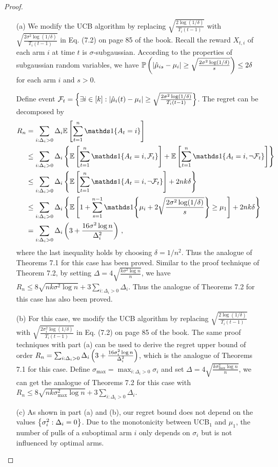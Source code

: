 \begin{proof}
\begin{enumerate}
    \item[(a)] We modify the UCB algorithm by replacing $\sqrt{\frac{2\log (1/\delta)}{T_i(t-1)}}$ with $\sqrt{\frac{2\sigma^2 \log (1/\delta)}{T_i(t-1)}}$ in Eq. (7.2) on page 85 of the book. 
    Recall the reward $X_{t,i}$ of each arm $i$ at time $t$ is $\sigma$-subgaussian. According to the properties of subgaussian random variables, we have $\mathbb{P} \left(\left| \hat{\mu}_{is} - \mu_i  \right|\ge \sqrt{\frac{2\sigma^2 \log (1/\delta)}{s}} \right) \le 2\delta$ for each arm $i$ and $s>0$. 

    Define event $\mathcal{F}_t = \left\{ \exists i \in [k]: \left| \hat{\mu}_{i}(t) - \mu_i  \right|\ge \sqrt{\frac{2\sigma^2 \log (1/\delta)}{T_i(t-1)}} \right\}$. 
    The regret can be decomposed by
    \begin{align*}
        R_n &= \sum_{i:\Delta_i>0}\Delta_i \EE{ \sum_{t=1}^n \bOne{A_t = i} } \\
        &\le \sum_{i:\Delta_i>0}\Delta_i \set{ \EE{ \sum_{t=1}^n \bOne{A_t = i, \cF_t} } +  \EE{ \sum_{t=1}^n \bOne{A_t = i, \neg \cF_t} } } \\
        &\le \sum_{i:\Delta_i>0}\Delta_i \set{ \EE{ \sum_{t=1}^n \bOne{A_t = i, \neg \cF_t} } +  2nk\delta }\\
        &\le \sum_{i:\Delta_i>0}\Delta_i \set{ \EE{ 1+ \sum_{s=1}^{n-1} \bOne{ \mu_i + 2\sqrt{\frac{2\sigma^2 \log (1/\delta)}{s}} } \ge \mu_1 }  +  2nk\delta } \\
        &= \sum_{i:\Delta_i>0}\Delta_i \bracket{ 3 + \frac{16\sigma^2 \log n}{\Delta_i^2}} \,,
    \end{align*}
    where the last inequality holds by choosing $\delta=1/n^2$.  Thus the analogue of Theorems 7.1 for this case has been proved. Similar to the proof technique of Theorem 7.2, by setting $\Delta = 4\sqrt{\frac{k\sigma^2 \log n}{n}}$, we have $R_n \le 8\sqrt{nk\sigma^2 \log n} + 3\sum_{i:\Delta_i >0} \Delta_i$. Thus the analogue of Theorems 7.2 for this case has also been proved. 

    \item[(b)] For this case, we modify the UCB algorithm by replacing $\sqrt{\frac{2\log (1/\delta)}{T_i(t-1)}}$ with $\sqrt{\frac{2\sigma_i^2 \log (1/\delta)}{T_i(t-1)}}$ in Eq. (7.2) on page 85 of the book. The same proof techniques with part (a) can be used to derive the regret upper bound of order $R_n = \sum_{i:\Delta_i>0}\Delta_i \left( 3 + \frac{16\sigma_i^2 \log n}{\Delta_i^2}\right)$, which is the analogue of Theorems 7.1 for this case. Define $\sigma_{\max} = \max_{i:\Delta_i>0}\sigma_i$ and set $\Delta = 4\sqrt{\frac{k\sigma_{\max}^2 \log n}{n}}$, we can get the analogue of Theorems 7.2 for this case with $R_n \le 8\sqrt{nk\sigma_{\max}^2 \log n} + 3\sum_{i:\Delta_i >0} \Delta_i$.

    \item[(c)] As shown in part (a) and (b), our regret bound does not depend on the values $\left\{ \sigma_i^2:\Delta_i=0 \right\}$. Due to the monotonicity between UCB$_1$ and $\mu_1$, the number of pulls of a suboptimal arm $i$ only depends on $\sigma_i$ but is not influenced by optimal arms. 
\end{enumerate}
\end{proof}
